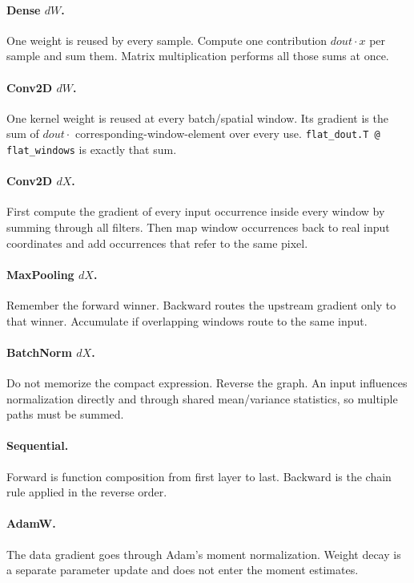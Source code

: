\documentclass[11pt,a4paper]{article}
\newcommand{\code}[1]{\texttt{#1}}
\begin{document}
\paragraph{Dense $dW$.}
One weight is reused by every sample. Compute one contribution $dout\cdot x$ per sample and sum them. Matrix multiplication performs all those sums at once.

\paragraph{Conv2D $dW$.}
One kernel weight is reused at every batch/spatial window. Its gradient is the sum of $dout\cdot$ corresponding-window-element over every use. \code{flat\_dout.T @ flat\_windows} is exactly that sum.

\paragraph{Conv2D $dX$.}
First compute the gradient of every input occurrence inside every window by summing through all filters. Then map window occurrences back to real input coordinates and add occurrences that refer to the same pixel.

\paragraph{MaxPooling $dX$.}
Remember the forward winner. Backward routes the upstream gradient only to that winner. Accumulate if overlapping windows route to the same input.

\paragraph{BatchNorm $dX$.}
Do not memorize the compact expression. Reverse the graph. An input influences normalization directly and through shared mean/variance statistics, so multiple paths must be summed.

\paragraph{Sequential.}
Forward is function composition from first layer to last. Backward is the chain rule applied in the reverse order.

\paragraph{AdamW.}
The data gradient goes through Adam's moment normalization. Weight decay is a separate parameter update and does not enter the moment estimates.
\end{document}
